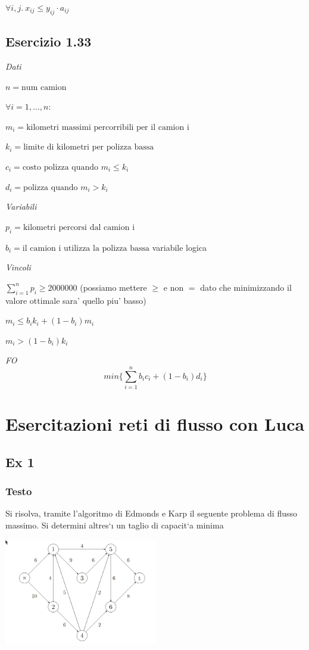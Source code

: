 $ \forall i,j.\ x_{ij} \leq y_{ij} \cdot a_{ij} $

\subsection{Esercizio 1.33}

\textit{Dati}

$ n = \text{num camion} $

$ \forall i = 1,...,n: $

$ m_i = \text{kilometri massimi percorribili per il camion i} $

$ k_i = \text{limite di kilometri per polizza bassa} $

$ c_i = \text{costo polizza quando } m_i \leq k_i $

$ d_i = \text{polizza quando } m_i > k_i $

\textit{Variabili}

$ p_i = \text{kilometri percorsi dal camion i} $

$ b_i = \text{il camion i utilizza la polizza bassa} $ variabile logica

\textit{Vincoli}

$ \sum_{i=1}^{n} p_i \geq 2000000 $ (possiamo mettere $ \geq $ e non $ = $ dato che minimizzando il valore ottimale sara' quello piu' basso)

$ m_i \leq b_i k_i + (1-b_i) m_i $

$ m_i > (1-b_i) k_i $

\textit{FO}
\[
  min \{\sum_{i=1}^{n} b_i c_i + (1-b_i) d_i \}
\]

\section{Esercitazioni reti di flusso con Luca}

\subsection{Ex 1}

\subsubsection{Testo}
Si risolva, tramite l’algoritmo di Edmonds e Karp il seguente problema di flusso massimo. Si determini altres`ı un taglio di capacit`a minima
\begin{center}
  \includegraphics[width=0.5\textwidth]{img/2025-04-07-09-32-32.png}
\end{center}

